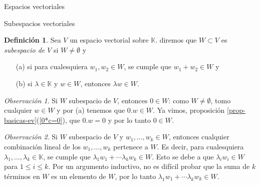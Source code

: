 \documentclass[a4paper,12pt,twoside,spanish,reqno]{amsbook}
\theoremstyle{definition}
\newtheorem{definicion}{Definici\'on}[section]
\theoremstyle{remark}
\newtheorem{observacion}{Observaci\'on}[section]
\newcommand{\K}{\mathbb K}
\begin{document}
\begin{chapter}{Espacios vectoriales}
\begin{section}{Subespacios vectoriales}
	\begin{definicion}
		Sea $V$ un espacio vectorial sobre $\K$. diremos que $W \subset V$ es \textit{subespacio de $V$} si $W \not= \emptyset$ y
		\begin{enumerate}
			\item[(a)] si para cualesquiera $w_1,w_2 \in W$, se cumple que $w_1+w_2 \in W$ y
			\item[(b)] si $\lambda \in \K$ y  $w \in W$, entonces $\lambda w \in W$.
		\end{enumerate}
	\end{definicion}

	\begin{observacion} Si $W$ subespacio de $V$,  entonces $0 \in W$: como  $W \ne \emptyset$, tomo  cualquier $w \in W$ y  por (a) tenemos que $0.w \in W$. Ya vimos, proposición \ref{prop-basicas-ev}(\ref{0*c=0}),  que $0.w =0$ y por lo tanto $0 \in W$. 
	\end{observacion}

	\begin{observacion}
		 Si $W$ subespacio de $V$ y $w_1,\ldots,w_k \in W$,  entonces cualquier combinación lineal de los $w_1,\ldots,w_k$ pertenece a $W$. Es decir, para cualesquiera $\lambda_1,\ldots,\lambda_k \in \K$, se cumple que  $\lambda_1w_1+\cdots\lambda_kw_k \in W$. Esto se debe a que $\lambda_iw_i \in W$ para $1\le i \le k$. Por un argumento inductivo, no es difícil probar que la suma de $k$ términos en $W$ es un elemento de $W$, por lo tanto $\lambda_1w_1+\cdots\lambda_kw_k \in W$.  
	\end{observacion}


\end{section}
\end{chapter}
\end{document}
